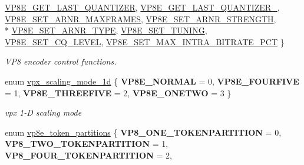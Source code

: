 \begin{DoxyCompactItemize}
\hyperlink{group__vp8__encoder_gga6deae3d561c838952552c3d3756322eca5bb0569b813853e981a61c97697cbecd}{V\-P8\-E\-\_\-\-G\-E\-T\-\_\-\-L\-A\-S\-T\-\_\-\-Q\-U\-A\-N\-T\-I\-Z\-E\-R}, 
\hyperlink{group__vp8__encoder_gga6deae3d561c838952552c3d3756322ecad2cfc9712d2eab30b5a59a60d0daaade}{V\-P8\-E\-\_\-\-G\-E\-T\-\_\-\-L\-A\-S\-T\-\_\-\-Q\-U\-A\-N\-T\-I\-Z\-E\-R\-\_}, 
\hyperlink{group__vp8__encoder_gga6deae3d561c838952552c3d3756322eca628d73f1a69fadd8aa57e0dfef578da8}{V\-P8\-E\-\_\-\-S\-E\-T\-\_\-\-A\-R\-N\-R\-\_\-\-M\-A\-X\-F\-R\-A\-M\-E\-S}, 
\hyperlink{group__vp8__encoder_gga6deae3d561c838952552c3d3756322eca0a8c40a768af935ae73faa53355c3244}{V\-P8\-E\-\_\-\-S\-E\-T\-\_\-\-A\-R\-N\-R\-\_\-\-S\-T\-R\-E\-N\-G\-T\-H}, 
\\*
\hyperlink{group__vp8__encoder_gga6deae3d561c838952552c3d3756322eca4e0a0af58670012026c213083cd48f3a}{V\-P8\-E\-\_\-\-S\-E\-T\-\_\-\-A\-R\-N\-R\-\_\-\-T\-Y\-P\-E}, 
\hyperlink{group__vp8__encoder_gga6deae3d561c838952552c3d3756322eca126ccbe7bde63b59cec5ea68a82dd498}{V\-P8\-E\-\_\-\-S\-E\-T\-\_\-\-T\-U\-N\-I\-N\-G}, 
\hyperlink{group__vp8__encoder_gga6deae3d561c838952552c3d3756322ecacd4f5b730bddb9788c3d0b82218ec503}{V\-P8\-E\-\_\-\-S\-E\-T\-\_\-\-C\-Q\-\_\-\-L\-E\-V\-E\-L}, 
\hyperlink{group__vp8__encoder_gga6deae3d561c838952552c3d3756322eca09c69ff4a3aabdb307d4f24027dfc4c1}{V\-P8\-E\-\_\-\-S\-E\-T\-\_\-\-M\-A\-X\-\_\-\-I\-N\-T\-R\-A\-\_\-\-B\-I\-T\-R\-A\-T\-E\-\_\-\-P\-C\-T}
 \}
\begin{DoxyCompactList}\small\item\em V\-P8 encoder control functions. \end{DoxyCompactList}\item 
enum \hyperlink{group__vp8__encoder_ga70071b1bb6cac9a1ef0ea3d8362ff94f}{vpx\-\_\-scaling\-\_\-mode\-\_\-1d} \{ {\bfseries V\-P8\-E\-\_\-\-N\-O\-R\-M\-A\-L} = 0, 
{\bfseries V\-P8\-E\-\_\-\-F\-O\-U\-R\-F\-I\-V\-E} = 1, 
{\bfseries V\-P8\-E\-\_\-\-T\-H\-R\-E\-E\-F\-I\-V\-E} = 2, 
{\bfseries V\-P8\-E\-\_\-\-O\-N\-E\-T\-W\-O} = 3
 \}
\begin{DoxyCompactList}\small\item\em vpx 1-\/\-D scaling mode \end{DoxyCompactList}\item 
enum \hyperlink{group__vp8__encoder_ga5f7508ba3fb453b47f62313ed0b864d2}{vp8e\-\_\-token\-\_\-partitions} \{ {\bfseries V\-P8\-\_\-\-O\-N\-E\-\_\-\-T\-O\-K\-E\-N\-P\-A\-R\-T\-I\-T\-I\-O\-N} = 0, 
{\bfseries V\-P8\-\_\-\-T\-W\-O\-\_\-\-T\-O\-K\-E\-N\-P\-A\-R\-T\-I\-T\-I\-O\-N} = 1, 
{\bfseries V\-P8\-\_\-\-F\-O\-U\-R\-\_\-\-T\-O\-K\-E\-N\-P\-A\-R\-T\-I\-T\-I\-O\-N} = 2, 

\end{DoxyCompactItemize}
